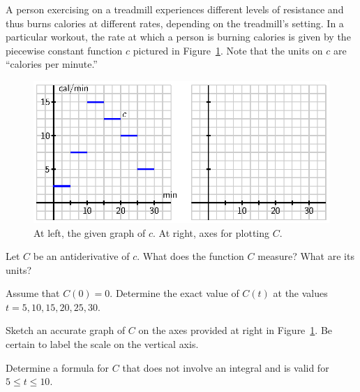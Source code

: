 \begin{exercises}
  \item A person exercising on a treadmill experiences different levels of resistance and thus burns calories at different rates, depending on the treadmill's setting.  In a particular workout, the rate at which a person is burning calories is given by the piecewise constant function $c$ pictured in Figure~\ref{F:5.1.Ez2}.  Note that the units on $c$ are ``calories per minute.''
  \begin{figure}[h]
\begin{center}
\includegraphics{figures/5_1_Ez2.eps}
\caption{At left, the given graph of $c$.  At right, axes for plotting $C$.} \label{F:5.1.Ez2}
\end{center}
\end{figure}
	\ba
		\item Let $C$ be an antiderivative of $c$.  What does the function $C$ measure?  What are its units?
		\item Assume that $C(0) = 0$.  Determine the exact value of $C(t)$ at the values $t = 5, 10, 15, 20, 25, 30$.
		\item Sketch an accurate graph of $C$ on the axes provided at right in Figure~\ref{F:5.1.Ez2}.  Be certain to label the scale on the vertical axis.
		\item Determine a formula for $C$ that does not involve an integral and is valid for $5 \le t \le 10$.
	\ea


\end{exercises}
